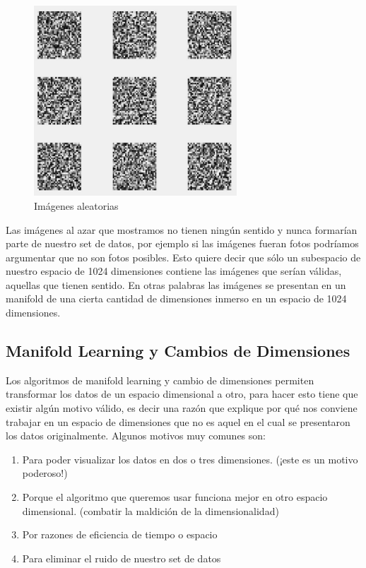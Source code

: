 \begin{figure}[!htb]
\centering
\includegraphics[width=3in]{figures/random-images-fig.png}
\caption{Imágenes aleatorias}

\end{figure}

Las imágenes al azar que mostramos no tienen ningún sentido y nunca formarían parte de nuestro set de datos, por ejemplo si las imágenes fueran fotos podríamos argumentar que no son fotos posibles. Esto quiere decir que sólo un subespacio de nuestro espacio de 1024 dimensiones contiene las imágenes que serían válidas, aquellas que tienen sentido. En otras palabras las imágenes se presentan en un manifold de una cierta cantidad de dimensiones inmerso en un espacio de 1024 dimensiones. 

\subsection{Manifold Learning y Cambios de Dimensiones}

Los algoritmos de manifold learning y cambio de dimensiones permiten transformar los datos de un espacio dimensional a otro, para hacer esto tiene que existir algún motivo válido, es decir una razón que explique por qué nos conviene trabajar en un espacio de dimensiones que no es aquel en el cual se presentaron los datos originalmente. Algunos motivos muy comunes son:

\begin{enumerate}
\item Para poder visualizar los datos en dos o tres dimensiones. (¡este es un motivo poderoso!)
\item Porque el algoritmo que queremos usar funciona mejor en otro espacio dimensional. (combatir la maldición de la dimensionalidad)
\item Por razones de eficiencia de tiempo o espacio
\item Para eliminar el ruido de nuestro set de datos
\end{enumerate}


